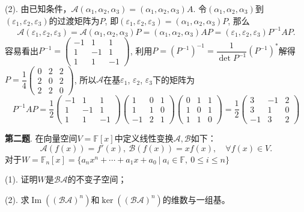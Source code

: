 (2). 由已知条件，$\mathscr{A}(\alpha_1,\alpha_2,\alpha_3) = (\alpha_1,\alpha_2,\alpha_3) A$. 令$(\alpha_1,\alpha_2,\alpha_3)$到$(\varepsilon_1,\varepsilon_2,\varepsilon_3)$的过渡矩阵为$P$, 即$(\varepsilon_1,\varepsilon_2,\varepsilon_3) = (\alpha_1,\alpha_2,\alpha_3) P$, 那么
$$\mathscr{A}(\varepsilon_1,\varepsilon_2,\varepsilon_3) = \mathscr{A}(\alpha_1,\alpha_2,\alpha_3) P = (\alpha_1,\alpha_2,\alpha_3) AP = (\varepsilon_1,\varepsilon_2,\varepsilon_3) P^{-1}AP.$$
容易看出$P^{-1} = \begin{pmatrix} -1 & 1 & 1 \\ 1 & -1 & 1 \\ 1 & 1 & -1 \end{pmatrix}$, 利用$P = (P^{-1})^{-1} = \dfrac{1}{\det P^{-1}} (P^{-1})^{\ast}$解得$P = \dfrac{1}{4} \begin{pmatrix} 0 & 2 & 2 \\ 2 & 0 & 2 \\ 2 & 2 & 0 \end{pmatrix}$, 所以$\mathscr{A}$在基$\varepsilon_1$, $\varepsilon_2$, $\varepsilon_3$下的矩阵为
$$P^{-1}AP = \dfrac{1}{2} \begin{pmatrix} -1 & 1 & 1 \\ 1 & -1 & 1 \\ 1 & 1 & -1 \end{pmatrix} \begin{pmatrix} 1 & 0 & 1 \\ 1 & 1 & 0 \\ -1 & 2 & 1 \end{pmatrix} \begin{pmatrix} 0 & 1 & 1 \\ 1 & 0 & 1 \\ 1 & 1 & 0 \end{pmatrix} = \dfrac{1}{2} \begin{pmatrix} 3 & -1 & 2 \\ 3 & 1 & 0 \\ -1 & 3 & 2 \end{pmatrix}$$

\newpageorvspace


{\bf 第二题}. 在向量空间$V = \mathbb{F}[x]$中定义线性变换$\mathscr{A, B}$如下：
$$\mathscr{A}(f(x)) = f'(x), ~ \mathscr{B}(f(x)) = xf(x), \quad \forall f(x) \in V.$$
对于$W = \mathbb{F}_n[x] = \{ a_nx^n + \cdots + a_1x + a_0 \ |\ a_i\in\mathbb{F},~ 0 \leqslant i \leqslant n \}$

(1). 证明$W$是$\mathscr{BA}$的不变子空间；

(2). 求$\operatorname{Im}((\mathscr{BA})^n)$和$\ker((\mathscr{BA})^n)$的维数与一组基。


